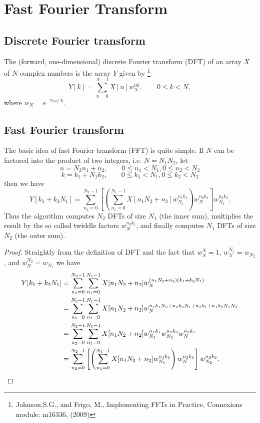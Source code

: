\chapter{Fast Fourier Transform}

\section{Discrete Fourier transform}
The (forward, one-dimensional) discrete Fourier transform (DFT) of an array $X$
of $N$ complex numbers is the array $Y$ given by
\footnote{Johnson,S.G., and Frigo, M., Implementing FFTs in Practice, Connexions
    module: m16336, (2009)}
\begin{equation}
  Y[k] = \sum_{n=0}^{N-1} X[n] w_N^{nk},  \qquad 0\le k<N,
\end{equation}
where $w_N=e^{-2\pi i/N}$.

\section{Fast Fourier transform}
The basic idea of fast Fourier transform (FFT) is quite simple. If $N$ can be
factored into the product of two integers, i.e. $N=N_1 N_2$, let 
\[
  n = N_2 n_1 + n_2,  \qquad 0\le n_1<N_1,  0\le n_2 <N_2
\]
\[
  k = k_1 + N_1 k_2,  \qquad 0\le k_1<N_1,  0\le k_2 <N_2
\]
then we have
\begin{equation}
  Y[k_1+k_2 N_1] = \sum_{n_2=0}^{N_2-1} 
     \left[
       \left( 
         \sum_{n_1=0}^{N_1-1} X[n_1 N_2+n_2] w_{N_1}^{n_1k_1}  
       \right) w_{N}^{n_2k_1}
     \right]   w_{N_2}^{n_2k_2}.
\end{equation}
Thus the algorithm computes $N_2$ DFTs of size $N_1$ (the inner sum), multiplies
the result by the so called twiddle factors $w_{N}^{n_2k_1}$, and finally
computes $N_1$ DFTs of size $N_2$ (the outer sum).

\begin{proof}
Straightly from the definition of DFT and the fact that $w_N^N=1$,
$w_N^{N_1}=w_{N_2}$, and $w_N^{N_2}=w_{N_1}$ we have
\begin{align*}
  Y[k_1+k_2 N_1] 
    &= \sum_{n_2=0}^{N_2-1} \sum_{n_1=0}^{N_1-1}
         X[n_1 N_2+n_2] w_{N}^{(n_1N_2+n_2)(k_1+k_2N_1)}  \notag \\
    &= \sum_{n_2=0}^{N_2-1} \sum_{n_1=0}^{N_1-1}
         X[n_1 N_2+n_2] w_{N}^{n_1k_1N_2+n_2k_2N_1+n_2k_1+n_1k_2N_1N_2}\notag \\
    &= \sum_{n_2=0}^{N_2-1} \sum_{n_1=0}^{N_1-1}
         X[n_1 N_2+n_2] w_{N_1}^{n_1k_1} w_{N_2}^{n_2k_2} w_{N}^{n_2k_1} 
         \notag \\
    &= \sum_{n_2=0}^{N_2-1} 
     \left[
       \left( 
         \sum_{n_1=0}^{N_1-1} X[n_1 N_2+n_2] w_{N_1}^{n_1k_1}  
       \right) w_{N}^{n_2k_1}
     \right]   w_{N_2}^{n_2k_2}. \notag
\end{align*}
\end{proof}

